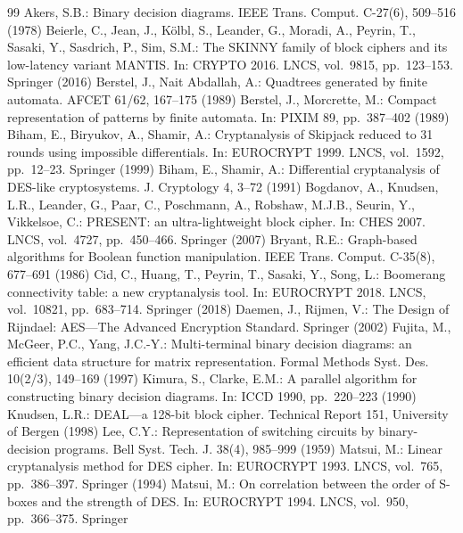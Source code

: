 \documentclass[runningheads]{llncs}
\begin{document}
\begin{thebibliography}{99}
 Akers, S.B.: Binary decision diagrams. IEEE Trans. Comput.
  C-27(6), 509--516 (1978)
 Beierle, C., Jean, J., K\"olbl, S., Leander, G., Moradi, A.,
  Peyrin, T., Sasaki, Y., Sasdrich, P., Sim, S.M.: The SKINNY family of block
  ciphers and its low-latency variant MANTIS. In: CRYPTO 2016. LNCS, vol.\ 9815,
  pp.\ 123--153. Springer (2016)
 Berstel, J., Nait Abdallah, A.: Quadtrees generated by finite
  automata. AFCET 61/62, 167--175 (1989)
 Berstel, J., Morcrette, M.: Compact representation of patterns
  by finite automata. In: PIXIM 89, pp.\ 387--402 (1989)
 Biham, E., Biryukov, A., Shamir, A.: Cryptanalysis of Skipjack
  reduced to 31 rounds using impossible differentials. In: EUROCRYPT 1999. LNCS,
  vol.\ 1592, pp.\ 12--23. Springer (1999)
 Biham, E., Shamir, A.: Differential cryptanalysis of DES-like
  cryptosystems. J. Cryptology 4, 3--72 (1991)
 Bogdanov, A., Knudsen, L.R., Leander, G., Paar, C., Poschmann,
  A., Robshaw, M.J.B., Seurin, Y., Vikkelsoe, C.: PRESENT: an ultra-lightweight
  block cipher. In: CHES 2007. LNCS, vol.\ 4727, pp.\ 450--466. Springer (2007)
 Bryant, R.E.: Graph-based algorithms for Boolean function
  manipulation. IEEE Trans. Comput. C-35(8), 677--691 (1986)
 Cid, C., Huang, T., Peyrin, T., Sasaki, Y., Song, L.: Boomerang
  connectivity table: a new cryptanalysis tool. In: EUROCRYPT 2018. LNCS,
  vol.\ 10821, pp.\ 683--714. Springer (2018)
 Daemen, J., Rijmen, V.: The Design of Rijndael: AES---The
  Advanced Encryption Standard. Springer (2002)
 Fujita, M., McGeer, P.C., Yang, J.C.-Y.: Multi-terminal binary
  decision diagrams: an efficient data structure for matrix representation.
  Formal Methods Syst. Des. 10(2/3), 149--169 (1997)
 Kimura, S., Clarke, E.M.: A parallel algorithm for constructing
  binary decision diagrams. In: ICCD 1990, pp.\ 220--223 (1990)
 Knudsen, L.R.: DEAL---a 128-bit block cipher. Technical Report 151,
  University of Bergen (1998)
 Lee, C.Y.: Representation of switching circuits by binary-decision
  programs. Bell Syst. Tech. J. 38(4), 985--999 (1959)
 Matsui, M.: Linear cryptanalysis method for DES cipher. In:
  EUROCRYPT 1993. LNCS, vol.\ 765, pp.\ 386--397. Springer (1994)
 Matsui, M.: On correlation between the order of S-boxes and the
  strength of DES. In: EUROCRYPT 1994. LNCS, vol.\ 950, pp.\ 366--375. Springer

\end{thebibliography}
\end{document}
